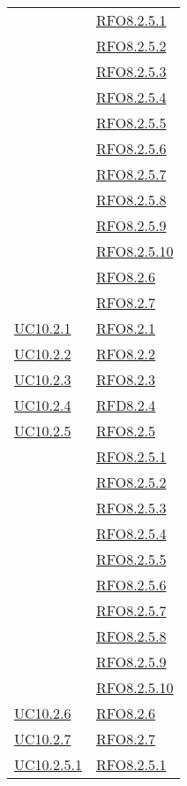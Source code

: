 \begin{longtable}{|>{\centering}m{5cm}|m{5cm}<{\centering}|}
& \hyperlink{RFO8.2.5.1}{RFO8.2.5.1}\\
& \hyperlink{RFO8.2.5.2}{RFO8.2.5.2}\\
& \hyperlink{RFO8.2.5.3}{RFO8.2.5.3}\\
& \hyperlink{RFO8.2.5.4}{RFO8.2.5.4}\\
& \hyperlink{RFO8.2.5.5}{RFO8.2.5.5}\\
& \hyperlink{RFO8.2.5.6}{RFO8.2.5.6}\\
& \hyperlink{RFO8.2.5.7}{RFO8.2.5.7}\\
& \hyperlink{RFO8.2.5.8}{RFO8.2.5.8}\\
& \hyperlink{RFO8.2.5.9}{RFO8.2.5.9}\\
& \hyperlink{RFO8.2.5.10}{RFO8.2.5.10}\\
& \hyperlink{RFO8.2.6}{RFO8.2.6}\\
& \hyperlink{RFO8.2.7}{RFO8.2.7}\\\hline
\hyperlink{UC10.2.1}{UC10.2.1} & \hyperlink{RFO8.2.1}{RFO8.2.1}\\\hline
\hyperlink{UC10.2.2}{UC10.2.2} & \hyperlink{RFO8.2.2}{RFO8.2.2}\\\hline
\hyperlink{UC10.2.3}{UC10.2.3} & \hyperlink{RFO8.2.3}{RFO8.2.3}\\\hline
\hyperlink{UC10.2.4}{UC10.2.4} & \hyperlink{RFD8.2.4}{RFD8.2.4}\\\hline
\hyperlink{UC10.2.5}{UC10.2.5} & \hyperlink{RFO8.2.5}{RFO8.2.5}\\
& \hyperlink{RFO8.2.5.1}{RFO8.2.5.1}\\
& \hyperlink{RFO8.2.5.2}{RFO8.2.5.2}\\
& \hyperlink{RFO8.2.5.3}{RFO8.2.5.3}\\
& \hyperlink{RFO8.2.5.4}{RFO8.2.5.4}\\
& \hyperlink{RFO8.2.5.5}{RFO8.2.5.5}\\
& \hyperlink{RFO8.2.5.6}{RFO8.2.5.6}\\
& \hyperlink{RFO8.2.5.7}{RFO8.2.5.7}\\
& \hyperlink{RFO8.2.5.8}{RFO8.2.5.8}\\
& \hyperlink{RFO8.2.5.9}{RFO8.2.5.9}\\
& \hyperlink{RFO8.2.5.10}{RFO8.2.5.10}\\\hline
\hyperlink{UC10.2.6}{UC10.2.6} & \hyperlink{RFO8.2.6}{RFO8.2.6}\\\hline
\hyperlink{UC10.2.7}{UC10.2.7} & \hyperlink{RFO8.2.7}{RFO8.2.7}\\\hline
\hyperlink{UC10.2.5.1}{UC10.2.5.1} & \hyperlink{RFO8.2.5.1}{RFO8.2.5.1}\\\hline

\end{longtable}
